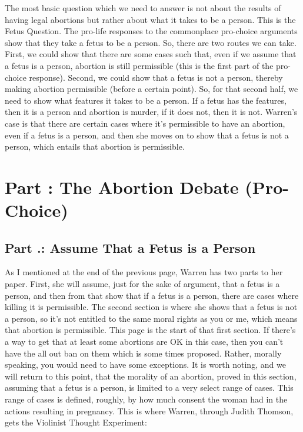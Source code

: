 The most basic question which we need to answer is not about the results of having legal abortions but rather about what it takes to be a person. This is the Fetus Question. The pro-life responses to the commonplace pro-choice arguments show that they take a fetus to be a person. So, there are two routes we can take. First, we could show that there are some cases such that, even if we assume that a fetus is a person, abortion is still permissible (this is the first part of the pro-choice response). Second, we could show that a fetus is not a person, thereby making abortion permissible (before a certain point). So, for that second half, we need to show what features it takes to be a person. If a fetus has the features, then it is a person and abortion is murder, if it does not, then it is not. Warren's case is that there are certain cases where it's permissible to have an abortion, even if a fetus is a person, and then she moves on to show that a fetus is not a person, which entails that abortion is permissible.
\chapter{Part \thechapcount: The Abortion Debate (Pro-Choice)}\setcounter{seccount}{1}
\section{Part \thechapcount.\theseccount: Assume That a Fetus is a Person}
As I mentioned at the end of the previous page, Warren has two parts to her paper. First, she will assume, just for the sake of argument, that a fetus is a person, and then from that show that if a fetus is a person, there are cases where killing it is permissible. The second section is where she shows that a fetus is not a person, so it's not entitled to the same moral rights as you or me, which means that abortion is permissible. This page is the start of that first section. If there's a way to get that at least some abortions are OK in this case, then you can't have the all out ban on them which is some times proposed. Rather, morally speaking, you would need to have some exceptions. It is worth noting, and we will return to this point, that the morality of an abortion, proved in this section, assuming that a fetus is a person, is limited to a very select range of cases. This range of cases is defined, roughly, by how much consent the woman had in the actions resulting in pregnancy.  This is where Warren, through Judith Thomson, gets the Violinist Thought Experiment:\autocite{Thomson1}

